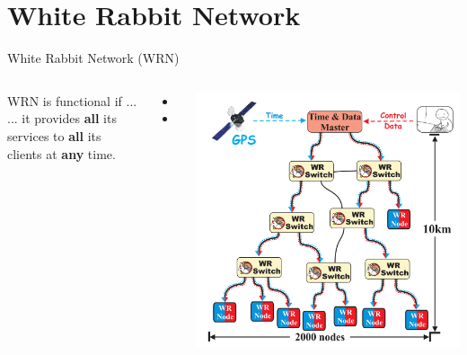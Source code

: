 \documentclass[compress, red]{beamer}
\begin{document}
\section{White Rabbit Network}
\begin{frame}{White Rabbit Network (WRN)}


\begin{columns}[c]

    \begin{block}{WRN is functional if ...}
    ... it provides {\bf all} its services to {\bf all} its clients at {\bf any} time.
    \end{block}

  \vspace{0.2cm}

  \begin{itemize}
    \item \color{blue!90}{Sub-nanosecond time synchronization}
    \item \color{red}{Deterministic Control Data delivery}
  \end{itemize}

    \begin{center}
    \includegraphics[height=1.0\textwidth]{network/wr_network-new.pdf}
    \end{center}
\end{columns}
  

\end{frame}
\end{document}
